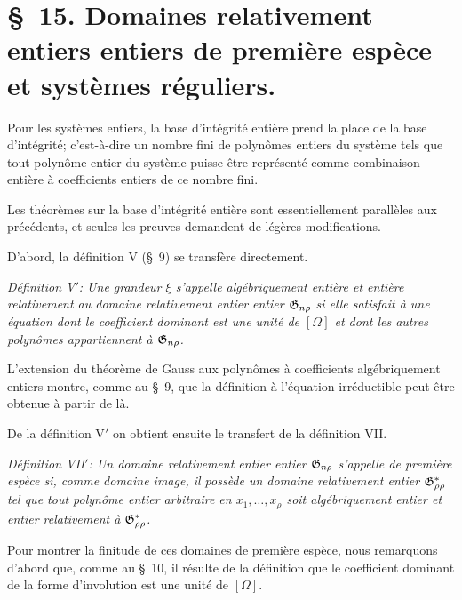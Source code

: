 \section*{\S\ 15. Domaines relativement entiers entiers de première espèce et systèmes réguliers.}

Pour les systèmes entiers, la base d'intégrité entière prend la place de la base d'intégrité; c'est-à-dire un nombre fini de polynômes entiers du système tels que tout polynôme entier du système puisse être représenté comme combinaison entière à coefficients entiers de ce nombre fini.

Les théorèmes sur la base d'intégrité entière sont essentiellement parallèles aux précédents, et seules les preuves demandent de légères modifications.

D'abord, la définition V (\S\ 9) se transfère directement.

\emph{Définition V$'$: Une grandeur $\xi$ s'appelle algébriquement entière et entière relativement au domaine relativement entier entier $\mathfrak{G}_{n\rho}$ si elle satisfait à une équation dont le coefficient dominant est une unité de $[\Omega]$ et dont les autres polynômes appartiennent à $\mathfrak{G}_{n\rho}$.}

L'extension du théorème de Gauss aux polynômes à coefficients algébriquement entiers montre, comme au \S\ 9, que la définition à l'équation irréductible peut être obtenue à partir de là.

De la définition V$'$ on obtient ensuite le transfert de la définition VII.

\emph{Définition VII$'$: Un domaine relativement entier entier $\mathfrak{G}_{n\rho}$ s'appelle de première espèce si, comme domaine image, il possède un domaine relativement entier $\mathfrak{G}^*_{\rho\rho}$ tel que tout polynôme entier arbitraire en $x_1,\ldots,x_\rho$ soit algébriquement entier et entier relativement à $\mathfrak{G}^*_{\rho\rho}$.}

Pour montrer la finitude de ces domaines de première espèce, nous remarquons d'abord que, comme au \S\ 10, il résulte de la définition que le coefficient dominant de la forme d'involution est une unité de $[\Omega]$.

